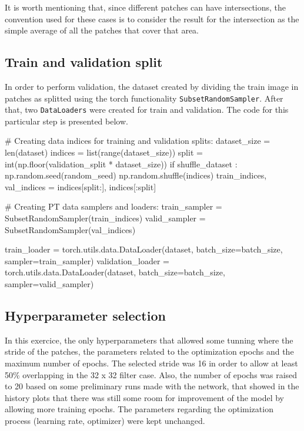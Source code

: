 \documentclass[10pt, a4paper]{article}
\begin{document}
It is worth mentioning that, since different patches can have intersections, the convention used for these cases is to consider the result for the intersection as
the simple average of all the patches that cover that area.

\subsection{Train and validation split}

In order to perform validation, the dataset created by dividing the train image in patches as splitted using the torch functionality {\tt SubsetRandomSampler}. After
that, two {\tt DataLoaders} were created for train and validation. The code for this particular step is presented below.

\begin{python}
# Creating data indices for training and validation splits:
dataset_size = len(dataset)
indices = list(range(dataset_size))
split = int(np.floor(validation_split * dataset_size))
if shuffle_dataset :
    np.random.seed(random_seed)
    np.random.shuffle(indices)
train_indices, val_indices = indices[split:], indices[:split]

# Creating PT data samplers and loaders:
train_sampler = SubsetRandomSampler(train_indices)
valid_sampler = SubsetRandomSampler(val_indices)

train_loader = torch.utils.data.DataLoader(dataset, batch_size=batch_size, 
                                           sampler=train_sampler)
validation_loader = torch.utils.data.DataLoader(dataset, batch_size=batch_size,
                                                sampler=valid_sampler)
\end{python}

\subsection{Hyperparameter selection}

In this exercice, the only hyperparameters that allowed some tunning where the stride of the patches, the parameters related to the optimization epochs and the 
maximum number of epochs. The selected stride was 16 in order to allow at least 50\% overlapping in the 32 x 32 filter case. Also, the number of epochs was raised
to 20 based on some preliminary runs made with the network, that showed in the history plots that there was still some room for improvement of the model by allowing
more training epochs. The parameters regarding the optimization process (learning rate, optimizer) were kept unchanged.
\end{document}

